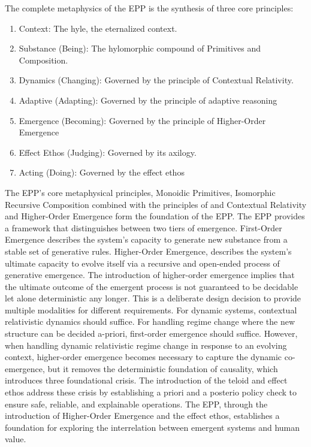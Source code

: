 The complete metaphysics of the EPP is the synthesis of three core principles:

\begin{enumerate}
\item Context: The hyle, the eternalized context. 
\item Substance (Being): The hylomorphic compound of Primitives and Composition.
\item Dynamics (Changing): Governed by the principle of Contextual Relativity.
\item Adaptive (Adapting): Governed by the principle of adaptive reasoning 
\item Emergence (Becoming): Governed by the principle of Higher-Order Emergence 
\item Effect Ethos (Judging): Governed by its axilogy. 
\item Acting (Doing): Governed by the effect ethos 
\end{enumerate}


The EPP's core metaphysical principles, Monoidic Primitives, Isomorphic Recursive Composition combined with the principles of and Contextual Relativity and  Higher-Order Emergence form the foundation of the EPP. The EPP provides a framework that distinguishes between two tiers of emergence. First-Order Emergence describes the system's capacity to generate new  substance from a stable set of generative rules. Higher-Order Emergence, describes the system's ultimate capacity to evolve itself via a recursive and open-ended process of generative emergence. The introduction of higher-order emergence implies that the ultimate outcome of the emergent process is not guaranteed to be decidable let alone deterministic any longer. This is a deliberate design decision to provide multiple modalities for different requirements. For dynamic systems, contextual relativistic dynamics should suffice. For handling regime change where the new structure can be decided a-priori, first-order emergence should suffice. However, when handling dynamic relativistic regime change in response to an evolving context, higher-order emergence becomes necessary to capture the dynamic co-emergence, but it removes the deterministic foundation of causality, which introduces three foundational crisis. The introduction of the teloid and effect ethos address these crisis by establishing a priori and a posterio policy check to ensure safe, reliable, and explainable operations. The EPP, through the introduction of Higher-Order Emergence and the effect ethos, establishes a foundation for exploring the interrelation between emergent systems and human value. 

\newpage